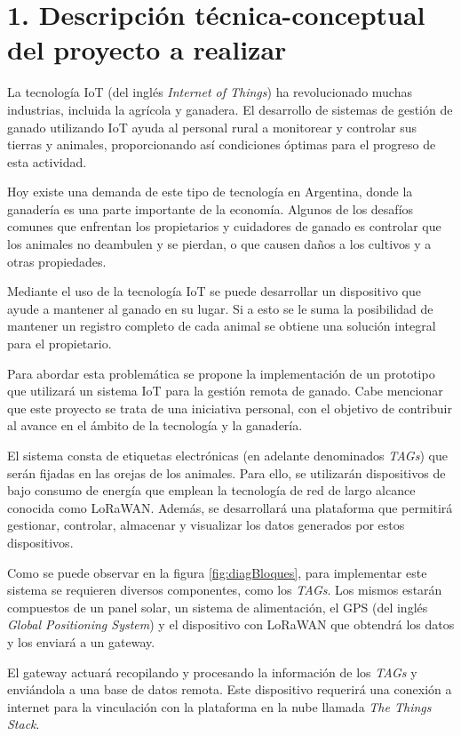 \documentclass[
11pt, %
]{charter}
\begin{document}
\section{1. Descripción técnica-conceptual del proyecto a realizar}
\label{sec:descripcion}

La tecnología IoT (del inglés \emph{Internet of Things}) ha revolucionado muchas industrias, incluida la agrícola y ganadera. El desarrollo de sistemas de gestión de ganado utilizando IoT ayuda al personal rural a monitorear y controlar sus tierras y animales, proporcionando así condiciones óptimas para el progreso de esta actividad.

Hoy existe una demanda de este tipo de tecnología en Argentina, donde la ganadería es una parte importante de la economía. Algunos de los desafíos comunes que enfrentan los propietarios y cuidadores de ganado es controlar que los animales no deambulen y se pierdan, o que causen daños a los cultivos y a otras propiedades.

Mediante el uso de la tecnología IoT se puede desarrollar un dispositivo que ayude a mantener al ganado en su lugar. Si a esto se le suma la posibilidad de mantener un registro completo de cada animal se obtiene una solución integral para el propietario.

Para abordar esta problemática se propone la implementación de un prototipo que utilizará un sistema IoT para la gestión remota de ganado. Cabe mencionar que este proyecto se trata de una iniciativa personal, con el objetivo de contribuir al avance en el ámbito de la tecnología y la ganadería.

El sistema consta de etiquetas electrónicas (en adelante denominados \emph{TAGs}) que serán fijadas en las orejas de los animales. Para ello, se utilizarán dispositivos de bajo consumo de energía que emplean la tecnología de red de largo alcance conocida como LoRaWAN. Además, se desarrollará una plataforma que permitirá gestionar, controlar, almacenar y visualizar los datos generados por estos dispositivos.

Como se puede observar en la figura \ref{fig:diagBloques}, para implementar este sistema se requieren diversos componentes, como los \emph{TAGs}. Los mismos estarán compuestos de un panel solar, un sistema de alimentación, el GPS (del inglés \emph{Global Positioning System}) y el dispositivo con LoRaWAN que obtendrá los datos y los enviará a un gateway. 

El gateway actuará recopilando y procesando la información de los \emph{TAGs} y enviándola a una base de datos remota. Este dispositivo requerirá una conexión a internet para la vinculación con la plataforma en la nube llamada \emph{The Things Stack}.
\end{document}
